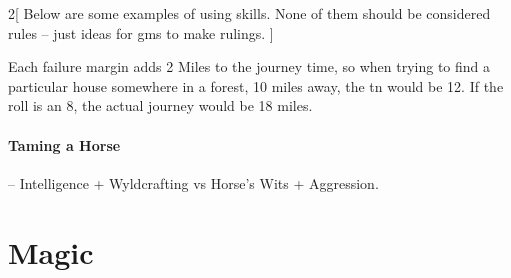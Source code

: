 \begin{multicols}{2}[
  Below are some examples of using skills.
  None of them should be considered rules -- just ideas for \glspl{gm} to make rulings.
]
\begin{itemize}
\end{itemize}

Each failure margin adds 2 Miles to the journey time, so when trying to find a particular house somewhere in a forest, 10 miles away, the \gls{tn} would be 12.
If the roll is an 8, the actual journey would be 18 miles.

\paragraph{Taming a Horse} -- Intelligence + Wyldcrafting vs Horse's Wits + Aggression.

\end{multicols}

\section{Magic}

